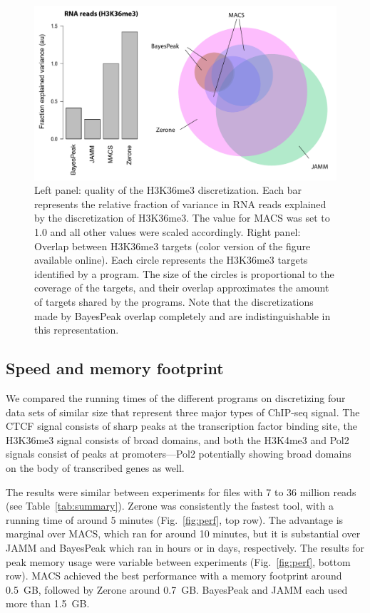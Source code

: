 \documentclass{bioinfo}
\begin{document}
\begin{figure}[!tpb]
\centerline{\includegraphics[scale=0.4]{histone_venn_color_names.pdf}}
\caption{
  Left panel: quality of the H3K36me3 discretization. Each bar
  represents the relative fraction of variance in RNA reads
  explained by the discretization of H3K36me3. The value for MACS was
  set to 1.0 and all other values were scaled accordingly. Right
  panel: Overlap between H3K36me3 targets (color version of the figure
  available online). Each circle represents the
  H3K36me3 targets identified by a program. The size of the circles
  is proportional to the coverage of the targets, and their overlap
  approximates the amount of targets shared by the programs. Note
  that the discretizations made by BayesPeak overlap completely and
  are indistinguishable in this representation.
}\label{fig:venn}
\end{figure}

\subsection{Speed and memory footprint}
We compared the running times of the different programs on discretizing
four data sets of similar size that represent three major types of
ChIP-seq signal. The CTCF signal consists of sharp
peaks at the transcription factor binding site, the H3K36me3 signal
consists of broad domains, and both the H3K4me3 and Pol2 signals consist
of peaks at promoters---Pol2 potentially showing broad domains on the
body of transcribed genes as well.

The results were similar between experiments for files with 7 to
36 million reads (see Table~\ref{tab:summary}). Zerone was
consistently the fastest tool, with a running time of around 5 minutes
(Fig.~\ref{fig:perf}, top row). The advantage is marginal over
MACS, which ran for around 10 minutes, but it is substantial over
JAMM and BayesPeak which ran in hours or in days, respectively.
The results for peak memory usage were variable between experiments
(Fig.~\ref{fig:perf},
bottom row). MACS achieved the best performance with a memory
footprint around 0.5~GB, followed by Zerone around 0.7~GB.
BayesPeak and JAMM each used more than 1.5~GB.
\end{document}
